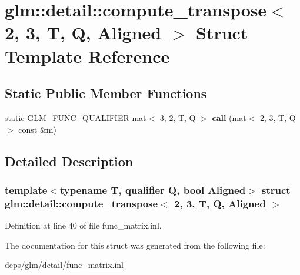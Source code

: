 \hypertarget{structglm_1_1detail_1_1compute__transpose_3_012_00_013_00_01T_00_01Q_00_01Aligned_01_4}{}\section{glm\+:\+:detail\+:\+:compute\+\_\+transpose$<$ 2, 3, T, Q, Aligned $>$ Struct Template Reference}
\label{structglm_1_1detail_1_1compute__transpose_3_012_00_013_00_01T_00_01Q_00_01Aligned_01_4}
\subsection*{Static Public Member Functions}
\begin{DoxyCompactItemize}
\item 
\mbox{\label{structglm_1_1detail_1_1compute__transpose_3_012_00_013_00_01T_00_01Q_00_01Aligned_01_4_a912a7588f6a6c2d499abd7df847096b6}} 
static G\+L\+M\+\_\+\+F\+U\+N\+C\+\_\+\+Q\+U\+A\+L\+I\+F\+I\+ER \hyperlink{structglm_1_1mat}{mat}$<$ 3, 2, T, Q $>$ {\bfseries call} (\hyperlink{structglm_1_1mat}{mat}$<$ 2, 3, T, Q $>$ const \&m)
\end{DoxyCompactItemize}


\subsection{Detailed Description}
\subsubsection*{template$<$typename T, qualifier Q, bool Aligned$>$\newline
struct glm\+::detail\+::compute\+\_\+transpose$<$ 2, 3, T, Q, Aligned $>$}



Definition at line 40 of file func\+\_\+matrix.\+inl.



The documentation for this struct was generated from the following file\+:\begin{DoxyCompactItemize}
\item 
deps/glm/detail/\hyperlink{func__matrix_8inl}{func\+\_\+matrix.\+inl}\end{DoxyCompactItemize}
